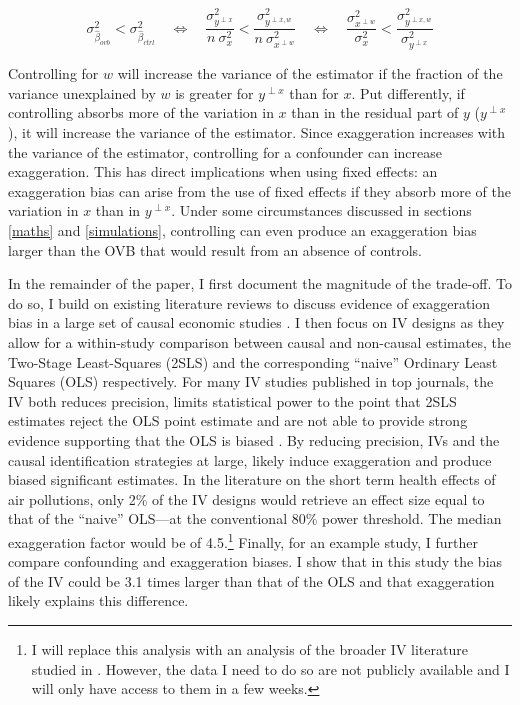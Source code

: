 			\[
				\sigma_{\hat{\beta}_{ovb}}^2 <  \sigma_{\hat{\beta}_{ctrl}}^2
                   		\quad \Leftrightarrow \quad 
				\dfrac{\sigma^{2}_{y^{\perp x}}}{n \ \sigma_{x}^{2}} < \dfrac{\sigma^{2}_{y^{\perp x, w}}}{n \ \sigma_{x^{\perp w}}^{2}}
				\quad \Leftrightarrow \quad 
				\dfrac{\sigma^{2}_{x^{\perp w}}}{\sigma_{x}^{2}} <
				\dfrac{\sigma^{2}_{y^{\perp x, w}}}{ \sigma_{y^{\perp x}}^{2}}
			\]
			
			Controlling for $w$ will increase the variance of the estimator if the fraction of the variance unexplained by $w$ is greater for $y^{\perp x}$ than for $x$. Put differently, if controlling absorbs more of the variation in $x$ than in the residual part of $y$ ($y^{\perp x}$), it will increase the variance of the estimator.  Since exaggeration increases with the variance of the estimator, controlling for a confounder can increase exaggeration.
			This has direct implications when using fixed effects: an exaggeration bias can arise from the use of fixed effects if they absorb more of the variation in $x$ than in $y^{\perp x}$. %
			 Under some circumstances discussed in sections \ref{maths} and \ref{simulations}, controlling can even produce an exaggeration bias larger than the OVB that would result from an absence of controls. 
			
			In the remainder of the paper, I first document the magnitude of the trade-off. To do so, I build on existing literature reviews to discuss evidence of exaggeration bias in a large set of causal economic studies \citep{brodeur_methods_2020, youngConsistencyInferenceInstrumental2022, bagilet_accurately_2023}. I then focus on IV designs as they allow for a within-study comparison between causal and non-causal estimates, the Two-Stage Least-Squares (2SLS) and the corresponding  ``naive'' Ordinary Least Squares (OLS) respectively. For many IV studies published in top journals, the IV both reduces precision, limits statistical power to the point that 2SLS estimates reject the OLS point estimate and are not able to provide strong evidence supporting that the OLS is biased \citep{youngConsistencyInferenceInstrumental2022}. By reducing precision, IVs and the causal identification strategies at large, likely induce exaggeration and produce biased significant estimates. In the literature on the short term health effects of air pollutions, only 2\% of the IV designs would retrieve an effect size equal to that of the ``naive'' OLS---at the conventional 80\% power threshold. The median exaggeration factor would be of 4.5.\footnote{I will replace this analysis with an analysis of the broader IV literature studied in \cite{youngConsistencyInferenceInstrumental2022}. However, the data I need to do so are not publicly available and I will only have access to them in a few weeks.} Finally, for an example study, I further compare confounding and exaggeration biases. I show that in this study the bias of the IV could be  3.1 times larger than that of the OLS and that exaggeration likely explains this difference. 
			
